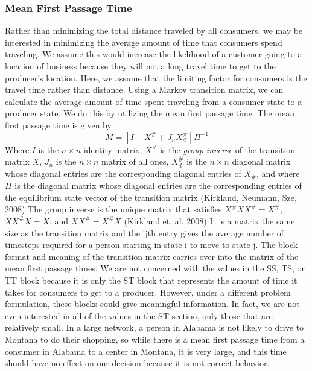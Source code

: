 \documentclass[twoside,twocolumn]{article}
\begin{document}
\subsubsection{Mean First Passage Time}
Rather than minimizing the total distance traveled by all consumers, we may be interested in minimizing the average amount of time that consumers spend traveling.
We assume this would increase the likelihood of a customer going to a location of business because they will not a long travel time to get to the producer's location. %
Here, we assume that the limiting factor for consumers is the travel time rather than distance.
Using a Markov transition matrix, we can calculate the average amount of time spent traveling from a consumer state to a producer state. %
We do this by utilizing the mean first passage time.
The mean first passage time is given by
$$ M = [I - X^{\#} + J_{n}X_{d}^{\#}]\Pi^{-1} $$
Where $I$ is the $n \times n$ identity matrix, $X^{\#}$ is the {\em group inverse} of the transition matrix $X$, $J_{n}$ is the $n \times n$ matrix of all ones, $X_{d}^{\#}$ is the $n \times n$ diagonal matrix whose diagonal entries are the corresponding diagonal entries of $X_{\#}$, and where $\Pi$ is the diagonal matrix whose diagonal entries are the corresponding entries of the equilibrium state vector of the transition matrix (Kirkland, Neumann, Sze, 2008) %
The group inverse is the unique matrix that satisfies $X^{\#}XX^{\#} = X^{\#}$, $XX^{\#}X = X$, and $XX^{\#} = X^{\#}X$ (Kirkland et. al. 2008)
It is a matrix the same size as the transition matrix and the ijth entry gives the average number of timesteps required for a person starting in state i to move to state j.
The block format and meaning of the transition matrix carries over into the matrix of the mean first passage times.
We are not concerned with the values in the SS, TS, or TT block because it is only the ST block that represents the amount of time it takes for consumers to get to a producer.
However, under a different problem formulation, these blocks could give meaningful information.
In fact, we are not even interested in all of the values in the ST section, only those that are relatively small.
In a large network, a person in Alabama is not likely to drive to Montana to do their shopping, so while there is a mean first passage time from a consumer in Alabama to a center in Montana, it is very large, and this time should have no effect on our decision because it is not correct behavior.
\end{document}
